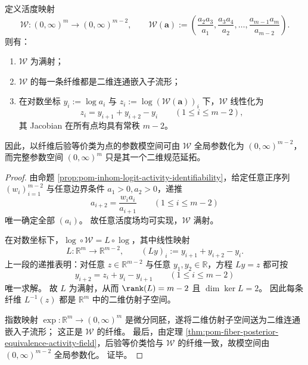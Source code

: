 \begin{proposition}[活度映射的满射性与二维纤维结构]\label{prop:pom-fiber-posterior-equivalence-moduli}
定义活度映射
\[
\mathcal W:(0,\infty)^m\longrightarrow(0,\infty)^{m-2},
\qquad
\mathcal W(\boldsymbol a)
:=
\left(
\frac{a_2a_3}{a_1},
\frac{a_3a_4}{a_2},
\dots,
\frac{a_{m-1}a_m}{a_{m-2}}
\right).
\]
则有：
\begin{enumerate}
  \item \(\mathcal W\) 为满射；
  \item \(\mathcal W\) 的每一条纤维都是二维连通嵌入子流形；
  \item 在对数坐标
  \(
  y_i:=\log a_i
  \)
  与
  \(
  z_i:=\log(\mathcal W(\boldsymbol a))_i
  \)
  下，\(\mathcal W\) 线性化为
  \[
  z_i=y_{i+1}+y_{i+2}-y_i\qquad(1\le i\le m-2),
  \]
  其 Jacobian 在所有点均具有常秩 \(m-2\)。
\end{enumerate}
因此，以纤维后验等价类为点的参数模空间可由 \(\mathcal W\) 全局参数化为 \((0,\infty)^{m-2}\)，而完整参数空间 \((0,\infty)^m\) 只是其一个二维规范延拓。
\end{proposition}
\begin{proof}
由命题 \ref{prop:pom-inhom-logit-activity-identifiability}，给定任意正序列
\(
(w_i)_{i=1}^{m-2}
\)
与任意边界条件 \(a_1>0,a_2>0\)，递推
\[
a_{i+2}=\frac{w_i a_i}{a_{i+1}}
\qquad(1\le i\le m-2)
\]
唯一确定全部 \((a_i)\)。
故任意活度场均可实现，\(\mathcal W\) 满射。

在对数坐标下，\(\log\circ \mathcal W=L\circ \log\)，其中线性映射
\[
L:\mathbb R^m\to\mathbb R^{m-2},
\qquad
(Ly)_i:=y_{i+1}+y_{i+2}-y_i.
\]
上一段的递推表明：对任意 \(z\in\mathbb R^{m-2}\) 与任意 \(y_1,y_2\in\mathbb R\)，方程
\(
Ly=z
\)
都可按
\[
y_{i+2}=z_i+y_i-y_{i+1}
\qquad(1\le i\le m-2)
\]
唯一求解。
故 \(L\) 为满射，从而
\(
\rank(L)=m-2
\)
且
\(
\dim\ker L=2
\)。
因此每条纤维 \(L^{-1}(z)\) 都是 \(\mathbb R^m\) 中的二维仿射子空间。

指数映射
\(
\exp:\mathbb R^m\to(0,\infty)^m
\)
是微分同胚，遂将二维仿射子空间送为二维连通嵌入子流形；
这正是 \(\mathcal W\) 的纤维。
最后，由定理 \ref{thm:pom-fiber-posterior-equivalence-activity-field}，后验等价类恰与 \(\mathcal W\) 的纤维一致，故模空间由 \((0,\infty)^{m-2}\) 全局参数化。
证毕。
\end{proof}


